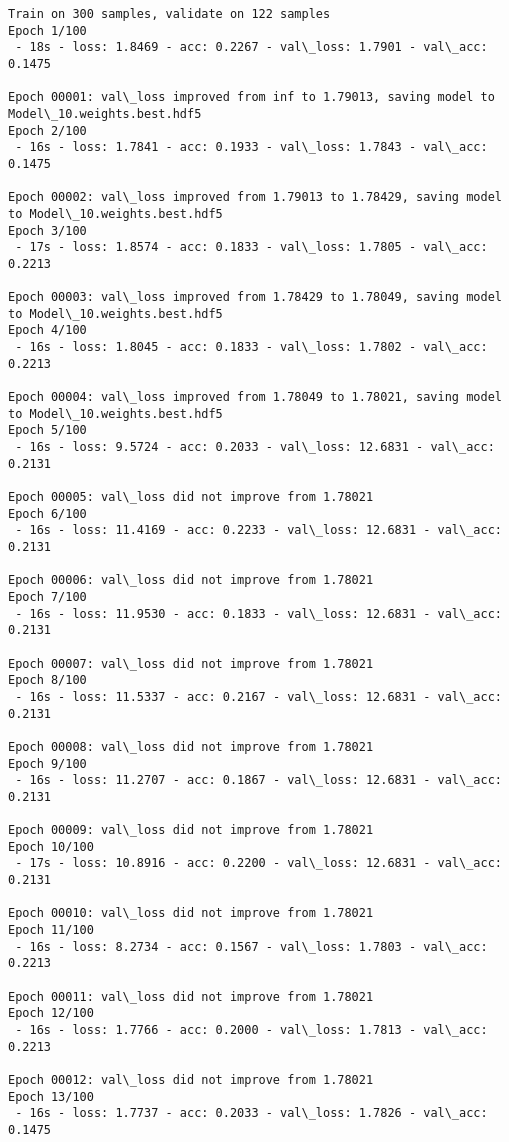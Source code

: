 \documentclass[11pt]{article}
\begin{document}
    \begin{Verbatim}[commandchars=\\\{\}]
Train on 300 samples, validate on 122 samples
Epoch 1/100
 - 18s - loss: 1.8469 - acc: 0.2267 - val\_loss: 1.7901 - val\_acc: 0.1475

Epoch 00001: val\_loss improved from inf to 1.79013, saving model to Model\_10.weights.best.hdf5
Epoch 2/100
 - 16s - loss: 1.7841 - acc: 0.1933 - val\_loss: 1.7843 - val\_acc: 0.1475

Epoch 00002: val\_loss improved from 1.79013 to 1.78429, saving model to Model\_10.weights.best.hdf5
Epoch 3/100
 - 17s - loss: 1.8574 - acc: 0.1833 - val\_loss: 1.7805 - val\_acc: 0.2213

Epoch 00003: val\_loss improved from 1.78429 to 1.78049, saving model to Model\_10.weights.best.hdf5
Epoch 4/100
 - 16s - loss: 1.8045 - acc: 0.1833 - val\_loss: 1.7802 - val\_acc: 0.2213

Epoch 00004: val\_loss improved from 1.78049 to 1.78021, saving model to Model\_10.weights.best.hdf5
Epoch 5/100
 - 16s - loss: 9.5724 - acc: 0.2033 - val\_loss: 12.6831 - val\_acc: 0.2131

Epoch 00005: val\_loss did not improve from 1.78021
Epoch 6/100
 - 16s - loss: 11.4169 - acc: 0.2233 - val\_loss: 12.6831 - val\_acc: 0.2131

Epoch 00006: val\_loss did not improve from 1.78021
Epoch 7/100
 - 16s - loss: 11.9530 - acc: 0.1833 - val\_loss: 12.6831 - val\_acc: 0.2131

Epoch 00007: val\_loss did not improve from 1.78021
Epoch 8/100
 - 16s - loss: 11.5337 - acc: 0.2167 - val\_loss: 12.6831 - val\_acc: 0.2131

Epoch 00008: val\_loss did not improve from 1.78021
Epoch 9/100
 - 16s - loss: 11.2707 - acc: 0.1867 - val\_loss: 12.6831 - val\_acc: 0.2131

Epoch 00009: val\_loss did not improve from 1.78021
Epoch 10/100
 - 17s - loss: 10.8916 - acc: 0.2200 - val\_loss: 12.6831 - val\_acc: 0.2131

Epoch 00010: val\_loss did not improve from 1.78021
Epoch 11/100
 - 16s - loss: 8.2734 - acc: 0.1567 - val\_loss: 1.7803 - val\_acc: 0.2213

Epoch 00011: val\_loss did not improve from 1.78021
Epoch 12/100
 - 16s - loss: 1.7766 - acc: 0.2000 - val\_loss: 1.7813 - val\_acc: 0.2213

Epoch 00012: val\_loss did not improve from 1.78021
Epoch 13/100
 - 16s - loss: 1.7737 - acc: 0.2033 - val\_loss: 1.7826 - val\_acc: 0.1475


\end{Verbatim}
\end{document}
